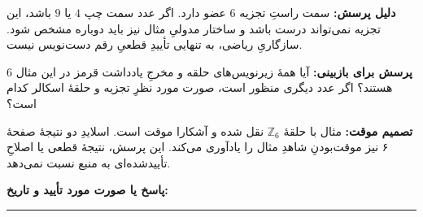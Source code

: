\documentclass[a4paper,12pt]{article}
\newcommand{\answer}{\medskip\textbf{پاسخ یا صورت مورد تأیید و تاریخ:}\par\vspace{18mm}\hrule\medskip}
\begin{document}
\textbf{دلیل پرسش:} سمت راستِ تجزیه $6$ عضو دارد. اگر عدد سمت چپ $4$ یا
$9$ باشد، این تجزیه نمی‌تواند درست باشد و ساختار مدولیِ مثال نیز باید دوباره
مشخص شود. سازگاریِ ریاضی، به تنهایی تأییدِ قطعیِ رقم دست‌نویس نیست.

\textbf{پرسش برای بازبینی:} آیا همهٔ زیرنویس‌های حلقه و مخرجِ یادداشت قرمز
در این مثال $6$ هستند؟ اگر عدد دیگری منظور است، صورت مورد نظرِ تجزیه و
حلقهٔ اسکالر کدام است؟

\textbf{تصمیم موقت:} مثال با حلقهٔ $\mathbb Z_6$ نقل شده و آشکارا موقت است.
اسلایدِ دو نتیجهٔ صفحهٔ ۶ نیز موقت‌بودنِ شاهدِ مثال را یادآوری می‌کند.
این پرسش، نتیجهٔ قطعی یا اصلاحِ تأییدشده‌ای به منبع نسبت نمی‌دهد.
\par\answer
\end{document}
